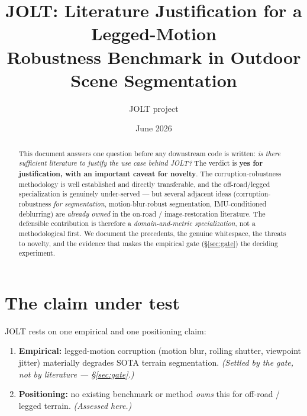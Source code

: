 \documentclass[11pt]{article}
\title{JOLT: Literature Justification for a Legged-Motion\\
Robustness Benchmark in Outdoor Scene Segmentation}
\author{JOLT project}
\date{June 2026}
\begin{document}
\maketitle

\begin{abstract}
This document answers one question before any downstream code is written:
\emph{is there sufficient literature to justify the use case behind JOLT?} The
verdict is \textbf{yes for justification, with an important caveat for novelty}.
The corruption-robustness methodology is well established and directly transferable,
and the off-road/legged specialization is genuinely under-served --- but several
adjacent ideas (corruption-robustness \emph{for segmentation}, motion-blur-robust
segmentation, IMU-conditioned deblurring) are \emph{already owned} in the on-road /
image-restoration literature. The defensible contribution is therefore a
\emph{domain-and-metric specialization}, not a methodological first. We document
the precedents, the genuine whitespace, the threats to novelty, and the evidence
that makes the empirical gate (\S\ref{sec:gate}) the deciding experiment.
\end{abstract}

\section{The claim under test}
JOLT rests on one empirical and one positioning claim:
\begin{enumerate}[noitemsep]
  \item \textbf{Empirical:} legged-motion corruption (motion blur, rolling shutter,
        viewpoint jitter) materially degrades SOTA terrain segmentation. \emph{(Settled
        by the gate, not by literature --- \S\ref{sec:gate}.)}
  \item \textbf{Positioning:} no existing benchmark or method \emph{owns} this for
        off-road / legged terrain. \emph{(Assessed here.)}
\end{enumerate}
\end{document}
